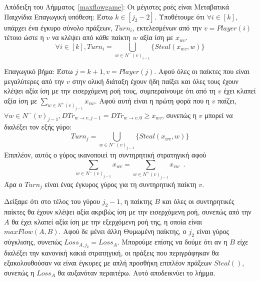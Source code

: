 \begin{sepproof}{Απόδειξη του Λήμματος~\ref{maxflowgame}: Οι μέγιστες ροές είναι Μεταβατικά Παιχνίδια}
  Επαγωγική υπόθεση: Έστω $k \in [j_2 - 2]$. Υποθέτουμε ότι $\forall i \in [k]$, υπάρχει ένα έγκυρο σύνολο πράξεων, $Turn_i$,
  εκτελεσμένων από την $v = Player\left(i\right)$ τέτοιο ώστε η $v$ να κλέψει από κάθε παίκτη $w$ αξία ίση με $x_{wv}$.
  \begin{equation*}
    \forall i \in [k], Turn_i = \bigcup\limits_{w \in N^{-}\left(v\right)_{i-1}}\{Steal\left(x_{wv}, w\right)\}
  \end{equation*}

  Επαγωγικό βήμα: Έστω $j = k + 1, v = Player\left(j\right)$. Αφού όλες οι παίκτες που είναι μεγαλύτερες από την $v$ στην
  ολική διάταξη έχουν ήδη παίξει και όλες τους έχουν κλέψει αξία ίση με την εισερχόμενη ροή τους, συμπεραίνουμε ότι από τη $v$
  έχει κλαπεί αξία ίση με $\sum\limits_{w \in N^{+}\left(v\right)_{j-1}}x_{vw}$. Αφού αυτή είναι η πρώτη φορά που η $v$
  παίζει, $\forall w \in N^{-}\left(v\right)_{j-1}, DTr_{w \rightarrow v, j-1} = DTr_{w \rightarrow v, 0} \geq x_{wv}$,
  συνεπώς η $v$ μπορεί να διαλέξει τον εξής γύρο:
  \begin{equation*}
    Turn_j = \bigcup\limits_{w \in N^{-}\left(v\right)_{j-1}}\{Steal\left(x_{wv}, w\right)\}
  \end{equation*}
  Επιπλέον, αυτός ο γύρος ικανοποιεί τη συντηρητική στρατηγική αφού
  \begin{equation*}
    \sum\limits_{w \in N^{-}\left(v\right)_{j-1}}x_{wv} = \sum\limits_{w \in N^{+}\left(v\right)_{j-1}}x_{vw} \enspace.
  \end{equation*}
  Άρα ο $Turn_j$ είναι ένας έγκυρος γύρος για τη συντηρητική παίκτη $v$.

  Δείξαμε ότι στο τέλος του γύρου $j_2 - 1$, η παίκτης $B$ και όλες οι συντηρητικές παίκτες θα έχουν κλέψει αξία ακριβώς ίση
  με την εισερχόμενη ροή, συνεπώς από την $A$ θα έχει κλαπεί αξία ίση με την εξερχόμενη ροή της, η οποία είναι
  $maxFlow\left(A, B\right)$. Αφού δε μένει άλλη Θυμωμένη παίκτης, ο $j_2$ είναι γύρος σύγκλισης, συνεπώς $Loss_{A, j_2} =
  Loss_A$. Μπορούμε επίσης να δούμε ότι αν η $B$ είχε διαλέξει την κανονική κακιά στρατηγική, οι πράξεις που περιγράφηκαν θα
  εξακολουθούσαν να είναι έγκυρες με απλή προσθήκη επιπλέον πράξεων $Steal\left(\right)$, συνεπώς η $Loss_A$ θα αυξανόταν
  περαιτέρω. Αυτό αποδεικνύει το λήμμα.
\end{sepproof}
